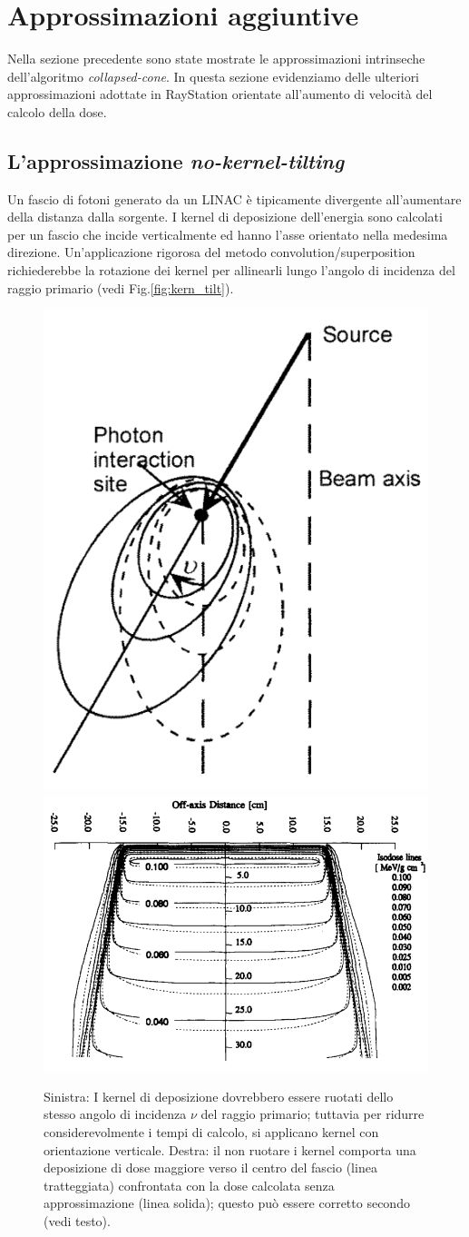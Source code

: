 {\section{Approssimazioni aggiuntive}
Nella sezione precedente sono state mostrate le approssimazioni intrinseche dell'algoritmo \textit{collapsed-cone}. In questa sezione evidenziamo delle ulteriori approssimazioni adottate in RayStation orientate all'aumento di velocità del calcolo della dose.

\subsection{L'approssimazione \textit{no-kernel-tilting}}
Un fascio di fotoni generato da un LINAC è tipicamente divergente all'aumentare della distanza dalla sorgente. I kernel di deposizione dell'energia sono calcolati per un fascio che incide verticalmente ed hanno l'asse orientato nella medesima direzione. Un'applicazione rigorosa del metodo convolution/superposition richiederebbe la rotazione dei kernel per allinearli lungo l'angolo di incidenza del raggio primario (vedi Fig.\ref{fig:kern_tilt}).\\
\begin{figure}
\centering
\includegraphics[width=.35\textwidth]{./cap1/kern_tilt.png}
\includegraphics[width=.6\textwidth]{./cap1/kern_tilt_b.png}
\caption{Sinistra: I kernel di deposizione dovrebbero essere ruotati dello stesso angolo di incidenza $\nu$ del raggio primario; tuttavia per ridurre considerevolmente i tempi di calcolo, si applicano kernel con orientazione verticale. Destra: il non ruotare i kernel comporta una deposizione di dose maggiore verso il centro del fascio (linea tratteggiata) confrontata con la dose calcolata senza approssimazione (linea solida); questo può essere corretto secondo \cite{Papanikolaou1993} (vedi testo).} 

\end{figure}}
